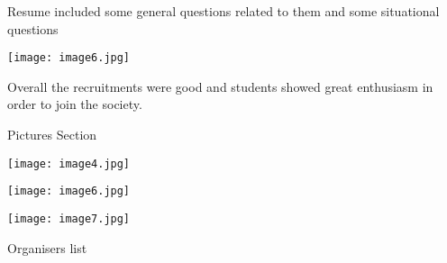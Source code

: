 \documentclass[12pt, a4 paper]{article}
\begin{document}
\begin{center}
\begin{Large}
\begin{multicols}{2}
\end{multicols} 

\begin{multicols}{2}
 Resume included some general questions related to them and some situational questions

\columnbreak
\texttt{[image: image6.jpg]}
  
\end{multicols} 


Overall the recruitments were good and students showed great enthusiasm in order to join the society.
  

\end{Large} 
\end{center}

\newpage 


\begin{center}
\Huge Pictures Section

\medskip\medskip\medskip

\texttt{[image: image4.jpg]}

\medskip\medskip\medskip

\texttt{[image: image6.jpg]}

\medskip\medskip\medskip

\texttt{[image: image7.jpg]}
\end{center}
\newpage
\begin{center}
\huge Organisers list
\end{center}
\end{document}

